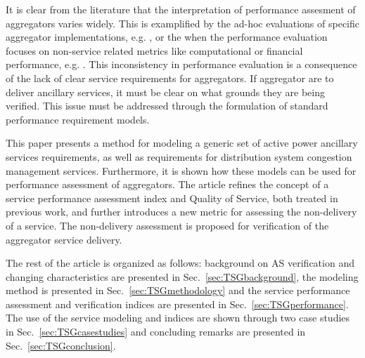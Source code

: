 It is clear from the literature that the interpretation of performance assesment of aggregators varies widely. This is examplified by the ad-hoc evaluations of specific aggregator implementations, e.g. \cite{vrettos2015frequency}, or the when the performance evaluation focuses on non-service related metrics like computational or financial performance, e.g. \cite{su2012performance,rahnama2014evaluation}. This inconsistency in performance evaluation is a consequence of the lack of clear service requirements for aggregators. If aggregator are to deliver ancillary services, it must be clear on what grounds they are being verified. This issue must be addressed through the formulation of standard performance requirement models.

This paper presents a method for modeling a generic set of active power ancillary services requirements, as well as requirements for distribution system congestion management services. Furthermore, it is shown how these models can be used for performance assessment of aggregators. The article refines the concept of a service performance assessment index and Quality of Service, both treated in previous work, and further introduces a new metric for assessing the non-delivery of a service. The non-delivery assessment is proposed for verification of the aggregator service delivery.

The rest of the article is organized as follows: background on AS verification and changing characteristics are presented in Sec.~\ref{sec:TSGbackground}, the modeling method is presented in Sec.~\ref{sec:TSGmethodology} and the service performance assessment and verification indices are presented in Sec.~\ref{sec:TSGperformance}. The use of the service modeling and indices are shown through two case studies in Sec.~\ref{sec:TSGcasestudies} and concluding remarks are presented in Sec.~\ref{sec:TSGconclusion}.
